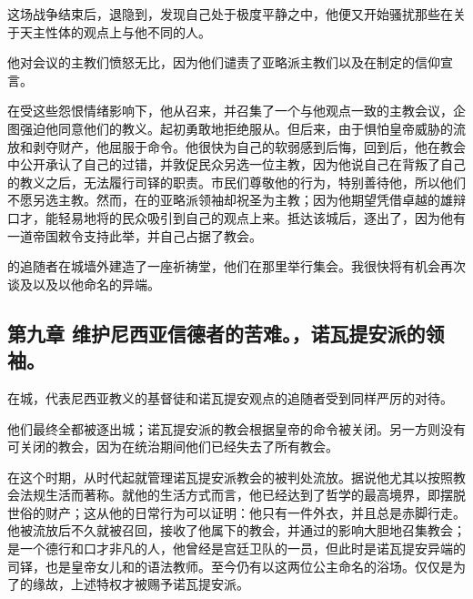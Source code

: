 这场战争结束后，退隐到，发现自己处于极度平静之中，他便又开始骚扰那些在关于天主性体的观点上与他不同的人。\par

他对会议的主教们愤怒无比，因为他们谴责了亚略派主教们以及在制定的信仰宣言。\par

在受这些怨恨情绪影响下，他从召来，并召集了一个与他观点一致的主教会议，企图强迫他同意他们的教义。起初勇敢地拒绝服从。但后来，由于惧怕皇帝威胁的流放和剥夺财产，他屈服于命令。他很快为自己的软弱感到后悔，回到后，他在教会中公开承认了自己的过错，并敦促民众另选一位主教，因为他说自己在背叛了自己的教义之后，无法履行司铎的职责。市民们尊敬他的行为，特别善待他，所以他们不愿另选主教。然而，在的亚略派领袖却祝圣为主教；因为他期望凭借卓越的雄辩口才，能轻易地将的民众吸引到自己的观点上来。抵达该城后，逐出了，因为他有一道帝国敕令支持此举，并自己占据了教会。\par

的追随者在城墙外建造了一座祈祷堂，他们在那里举行集会。我很快将有机会再次谈及以及以他命名的异端。\par


\subsection{第九章 维护尼西亚信德者的苦难。，诺瓦提安派的领袖。}

在城，代表尼西亚教义的基督徒和诺瓦提安观点的追随者受到同样严厉的对待。\par

他们最终全都被逐出城；诺瓦提安派的教会根据皇帝的命令被关闭。另一方则没有可关闭的教会，因为在统治期间他们已经失去了所有教会。\par

在这个时期，从时代起就管理诺瓦提安派教会的被判处流放。据说他尤其以按照教会法规生活而著称。就他的生活方式而言，他已经达到了哲学的最高境界，即摆脱世俗的财产；这从他的日常行为可以证明：他只有一件外衣，并且总是赤脚行走。他被流放后不久就被召回，接收了他属下的教会，并通过的影响大胆地召集教会；是一个德行和口才非凡的人，他曾经是宫廷卫队的一员，但此时是诺瓦提安异端的司铎，也是皇帝女儿和的语法教师。至今仍有以这两位公主命名的浴场。仅仅是为了的缘故，上述特权才被赐予诺瓦提安派。\par

